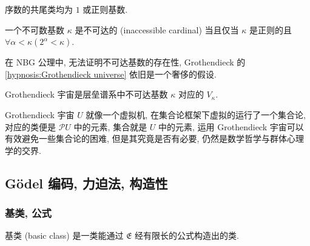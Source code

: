 \begin{corollary}
    序数的共尾类均为 \(1\) 或正则基数.
\end{corollary}

\begin{definition}
    \label {definition:inaccessible cardinal}
    一个不可数基数 \(\kappa\) 是不可达的 (inaccessible cardinal) 当且仅当 \(\kappa\) 是正则的且 \(\forall \alpha < \kappa (2^\alpha < \kappa)\).
\end{definition}

在 NBG 公理中, 无法证明不可达基数的存在性, Grothendieck 的 \ref{hypnosis:Grothendieck universe} 依旧是一个奢侈的假设.

\begin{theorem}
    Grothendieck 宇宙是层垒谱系中不可达基数 \(\kappa\) 对应的 \(V_\kappa\).
\end{theorem}

Grothendieck 宇宙 \(U\) 就像一个虚拟机, 在集合论框架下虚拟的运行了一个集合论, 对应的类便是 \(\mathcal{P} U\) 中的元素, 集合就是 \(U\) 中的元素,
运用 Grothendieck 宇宙可以有效避免一些集合论的困难, 但是其究竟是否有必要, 仍然是数学哲学与群体心理学的交界.

\subsection{Gödel 编码, 力迫法, 构造性}

\subsubsection{基类, 公式}

\begin{definition}
    基类 (basic class) 是一类能通过 \(\mathfrak{E}\) 经有限长的公式构造出的类.
\end{definition}

